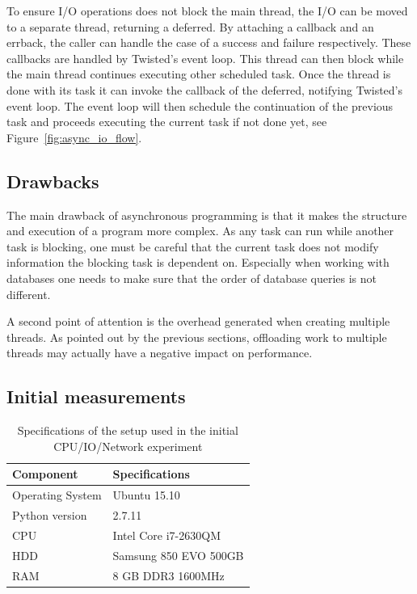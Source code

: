 To ensure I/O operations does not block the main thread, the I/O can be moved to a separate thread, returning a deferred.
By attaching a callback and an errback, the caller can handle the case of a success and failure respectively.
These callbacks are handled by Twisted's event loop.
This thread can then block while the main thread continues executing other scheduled task.
Once the thread is done with its task it can invoke the callback of the deferred, notifying Twisted's event loop.
The event loop will then schedule the continuation of the previous task and proceeds executing the current task if not done yet, see Figure~\ref{fig:async_io_flow}.

\subsection{Drawbacks}

The main drawback of asynchronous programming is that it makes the structure and execution of a program more complex.
As any task can run while another task is blocking, one must be careful that the current task does not modify information the blocking task is dependent on.
Especially when working with databases one needs to make sure that the order of database queries is not different.

A second point of attention is the overhead generated when creating multiple threads.
As pointed out by the previous sections, offloading work to multiple threads may actually have a negative impact on performance.

\subsection{Initial measurements}

\begin{table}[h]
	\centering
	\caption{Specifications of the setup used in the initial CPU/IO/Network experiment}
	\label{table:setup_initial_experiment}
	\begin{tabular}{l|l}
		\textbf{Component} 	& \textbf{Specifications} \\ \hline
		Operating System   	& Ubuntu 15.10 \\
		Python version		& 2.7.11 \\
		CPU					& Intel Core i7-2630QM \\ 
		HDD					& Samsung 850 EVO 500GB  \\ 
		RAM					& 8 GB DDR3 1600MHz \\
	\end{tabular}
\end{table}

